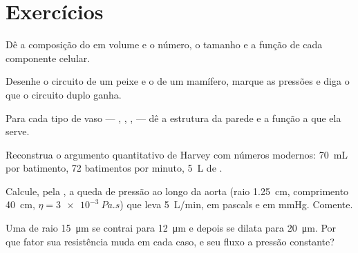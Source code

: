 \section{Exercícios}

\begin{exercise}[$\star$]\label{exo:b2:blood-circulation:1}
Dê a composição do  em volume e o número, o tamanho e a função de
cada componente celular.
\end{exercise}

\begin{exercise}[$\star$]\label{exo:b2:blood-circulation:2}
Desenhe o circuito de um peixe e o de um mamífero, marque as pressões e
diga o que o circuito duplo ganha.
\end{exercise}

\begin{exercise}[$\star$]\label{exo:b2:blood-circulation:3}
Para cada tipo de vaso --- , , ,  --- dê a
estrutura da parede e a função a que ela serve.
\end{exercise}

\begin{exercise}[$\star$]\label{exo:b2:blood-circulation:4}
Reconstrua o argumento quantitativo de Harvey com números modernos:
\qty{70}{mL} por batimento, \num{72} batimentos por minuto, \qty{5}{L}
de .
\end{exercise}

\begin{exercise}[$\star\star$]\label{exo:b2:blood-circulation:5}
Calcule, pela , a queda de pressão ao longo da aorta
(raio \qty{1.25}{cm}, comprimento \qty{40}{cm},
$\eta = \qty{3e-3}{Pa.s}$) que leva \qty{5}{L/min}, em pascals e em
mmHg. Comente.
\end{exercise}

\begin{exercise}[$\star\star$]\label{exo:b2:blood-circulation:6}
Uma  de raio \qty{15}{\micro m} se contrai para
\qty{12}{\micro m} e depois se dilata para \qty{20}{\micro m}. Por que
fator sua resistência muda em cada caso, e seu fluxo a pressão
constante?
\end{exercise}

